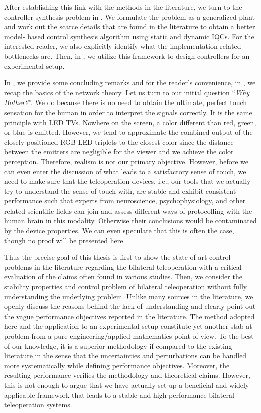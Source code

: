 After establishing this link with the methods in the literature, we turn to the controller synthesis problem in . We 
formulate the problem as a generalized plant and work out the scarce details that are found in the literature to obtain a better model-
based control synthesis algorithm using static and dynamic IQCs. For the interested reader, we also explicitly identify what the 
implementation-related bottlenecks are. Then, in , we utilize this framework to design controllers for an experimental 
setup.

In , we provide some concluding remarks and for the reader's convenience, in , we recap the basics 
of the network theory.
\newpage
Let us turn to our initial question \enquote{\emph{Why Bother?}}. We do because there is no need to obtain the ultimate, perfect touch sensation for 
the human in order to interpret the signals correctly. It is the same principle with LED TVs. Nowhere on the screen, a color different 
than red, green, or blue is emitted. However, we tend to approximate the combined output of the closely positioned RGB LED triplets to 
the closest color since the distance between the emitters are negligible for the viewer and we achieve the color perception. Therefore, 
realism is not our primary objective. However, before we can even enter the discussion of what leads to a satisfactory sense of touch, 
we need to make sure that the teleoperation devices, i.e., our tools that we actually try to understand the sense of touch with, are 
stable and exhibit consistent performance such that experts from neuroscience, psychophysiology, and other related scientific fields can 
join and assess different ways of protocolling with the human brain in this modality. Otherwise their conclusions would be contaminated 
by the device properties. We can even speculate that this is often the case, though no proof will be presented here.  


Thus the precise goal of this thesis is first to show the state-of-art control problems in the literature regarding the bilateral 
teleoperation with a critical evaluation of the claims often found in various studies. Then, we consider the stability properties and 
control problem of bilateral teleoperation without fully understanding the underlying problem. Unlike many sources in the literature, we 
openly discuss the reasons behind the lack of understanding and clearly point out the vague performance objectives reported in the 
literature. The method adopted here and the application to an experimental setup constitute yet another stab at problem from a pure 
engineering/applied mathematics point-of-view. To the best of our knowledge, it is a superior methodology if compared to the existing 
literature in the sense that the uncertainties and perturbations can be handled more systematically while defining performance objectives. 
Moreover, the resulting performance verifies the methodology and theoretical claims. However, this is not enough to argue that we have 
actually set up a beneficial and widely applicable framework that leads to a stable and high-performance bilateral teleoperation systems. 

